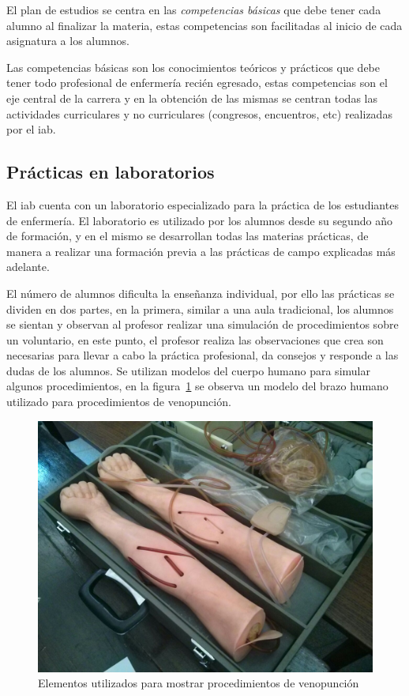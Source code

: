 El plan de estudios se centra en las \emph{competencias básicas} que debe tener
cada alumno al finalizar la materia, estas competencias son facilitadas al
inicio de cada asignatura a los alumnos.

Las competencias básicas son los conocimientos teóricos y prácticos que debe
tener todo profesional de enfermería recién egresado, estas competencias son el
eje central de la carrera y en la obtención de las mismas se centran todas las
actividades curriculares y no curriculares (congresos, encuentros, etc)
realizadas por el \Gls{iab}.



\subsection{Prácticas en laboratorios}
\label{sec:practica_lab}

El \Gls{iab} cuenta con un laboratorio especializado para la práctica de los
estudiantes de enfermería. El laboratorio es utilizado por los alumnos 
desde su segundo año de formación, y en el mismo se desarrollan todas las materias 
prácticas, de manera a realizar una formación previa a las prácticas de campo 
explicadas más adelante.

El número de alumnos dificulta la enseñanza individual, por ello las prácticas se
dividen en dos partes, en la primera, similar a una aula tradicional, los
alumnos se sientan y observan al profesor realizar una simulación de
procedimientos sobre un voluntario, en este punto, el profesor realiza las
observaciones que crea son necesarias para llevar a cabo la práctica
profesional, da consejos y responde a las dudas de los alumnos.
Se utilizan modelos del cuerpo humano para simular
algunos procedimientos, en la figura~\ref{fig:iab_veno} se observa un modelo del
brazo humano utilizado para procedimientos de venopunción.

\begin{figure}[h!t] 
\centering 
\includegraphics[scale=0.2,natwidth=100,natheight=100]{problema/iab_sala_2.jpg}
\caption{Elementos utilizados para mostrar procedimientos de venopunción}
\label{fig:iab_veno}
\end{figure}

